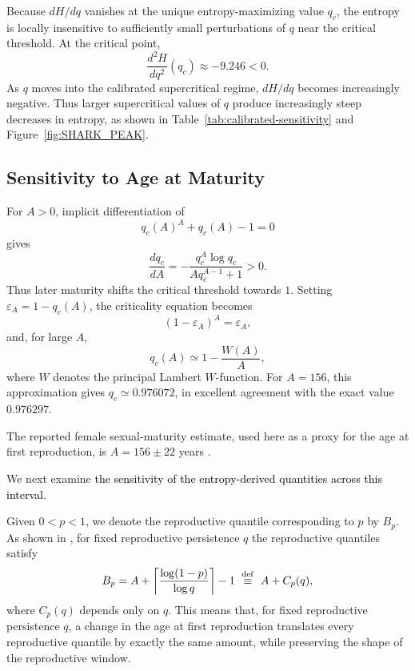 \documentclass[11pt,a4paper]{amsart}
\begin{document}
Because $dH/dq$ vanishes at the unique entropy-maximizing value $q_c$,
the entropy is locally insensitive to sufficiently small perturbations
of $q$ near the critical threshold. At the critical point,
\[
\frac{d^2H}{dq^2}(q_c)\approx -9.246<0.
\]
As $q$ moves into the calibrated supercritical regime, $dH/dq$
becomes increasingly negative. Thus larger supercritical values of
$q$ produce increasingly steep decreases in entropy, as shown in Table~\ref{tab:calibrated-sensitivity} and Figure~\ref{fig:SHARK_PEAK}.

\FloatBarrier

\subsection{Sensitivity to Age at Maturity}

For $A > 0$, implicit differentiation of
\[
q_c(A)^A+q_c(A)-1=0
\]
gives
\begin{equation}
\frac{dq_c}{dA}
=
-\frac{q_c^A\log q_c}
       {Aq_c^{A-1}+1}
>0.
\label{eq:qc-derivative}
\end{equation}
Thus later maturity shifts the critical threshold towards \(1\). Setting
\(\varepsilon_A=1-q_c(A)\), the criticality equation becomes
\[
(1-\varepsilon_A)^A=\varepsilon_A,
\]
and, for large \(A\),
\begin{equation}
q_c(A)
\simeq
1-\frac{W(A)}{A},
\label{eq:qc-lambert}
\end{equation}
where \(W\) denotes the principal Lambert \(W\)-function. For \(A=156\),
this approximation gives \(q_c\simeq0.976072\),  in excellent agreement with the exact value \(0.976297\).

The reported female sexual-maturity estimate, used here as a proxy
for the age at first reproduction, is $A=156\pm22$ years
\cite{Nielsen2016GreenlandShark}.

We next examine
\textcolor{black}{the sensitivity of the entropy-derived quantities across this interval.}


Given $0 < p < 1$, we denote the reproductive quantile corresponding to $p$ by $B_p$. As shown in \cite{BuescuElaydiOliveira2026}, 
for fixed reproductive persistence $q$ the reproductive quantiles
satisfy 
\[
B_p
=
A+
\left\lceil
\frac{\log(1-p)}{\log q}
\right\rceil
-1 \ \stackrel{\rm def}{\equiv} \  A + C_p(q), 
\]
where $C_p(q)$ depends only on $q$. 
This means that, for fixed reproductive persistence $q$, a change in
the age at first reproduction translates every reproductive quantile
by exactly the same amount, while preserving the shape of the
reproductive window.
\end{document}
